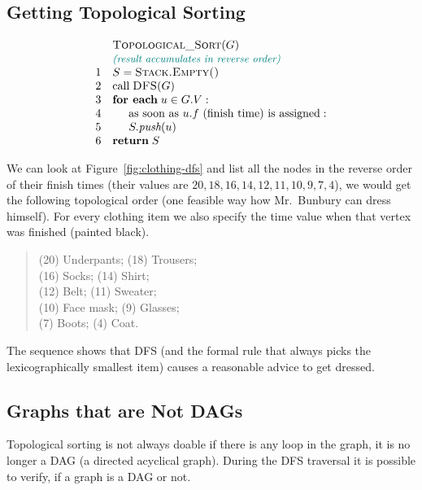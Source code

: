\documentclass[a4paper,12pt]{article}
\begin{document}
\subsection{Getting Topological Sorting}

$$\begin{array}{rl}
  & \text{\sc Topological\textunderscore{}Sort}(G)\\
  & \textcolor{teal}{\small \text{\em (result accumulates in reverse order)}}\\
1 & S = \text{\sc Stack.Empty()}\\
2 & \text{call}\;\text{\sc DFS}(G)\\
3 & \text{\bf for each}\;u \in G.V:\\ 
4 & \hspace{0.5cm} \text{as soon as $u.f$ (finish time) is assigned}:\\
5 & \hspace{0.5cm} S.\text{\em push}(u)\\
6 & \text{\bf return}\;S\\
\end{array}$$

We can look at Figure~\ref{fig:clothing-dfs} and list all the nodes in the 
reverse order of their finish times (their values are $20,18,16,14,12,11,10,9,7,4$), 
we would get the following topological order (one feasible way how 
Mr.\ Bunbury can dress himself). For every clothing item we
also specify the time value when that vertex was finished (painted black).

\begin{quote}
(20) Underpants; (18) Trousers;\\
(16) Socks; (14) Shirt;\\
(12) Belt; (11) Sweater;\\
(10) Face mask; (9) Glasses;\\
(7) Boots; (4) Coat. 
\end{quote}

The sequence shows that DFS (and the formal rule that always
picks the lexicographically smallest item) causes a reasonable 
advice to get dressed.



\subsection{Graphs that are Not DAGs}

Topological sorting is not always doable \textendash{} if there 
is any loop in the graph, it is no longer a DAG 
(a directed acyclical graph). 
During the DFS traversal it is possible to verify, 
if a graph is a DAG or not. 
\end{document}
